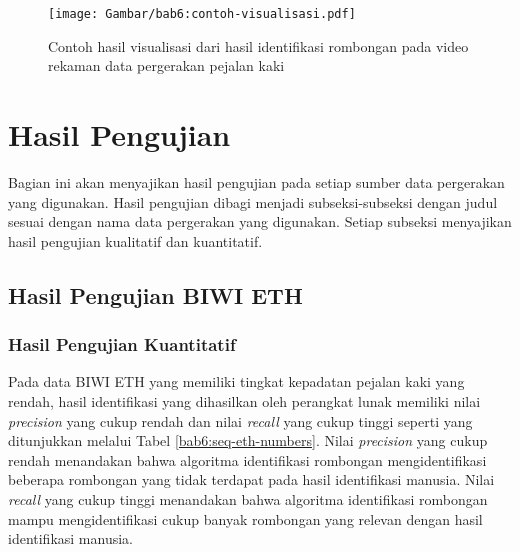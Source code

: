 \begin{figure}[h]
    \centering
    \captionsetup{width=0.85\textwidth}
    \texttt{[image: Gambar/bab6:contoh-visualisasi.pdf]}
    \caption[Contoh hasil visualisasi rombongan]{Contoh hasil visualisasi dari hasil identifikasi rombongan pada video rekaman data pergerakan pejalan kaki}
    \label{bab6:contoh-visualisasi}
\end{figure}

\section{Hasil Pengujian}
\label{sec:result}

Bagian ini akan menyajikan hasil pengujian pada setiap sumber data pergerakan yang digunakan. Hasil pengujian dibagi menjadi subseksi-subseksi dengan judul sesuai dengan nama data pergerakan yang digunakan. Setiap subseksi menyajikan hasil pengujian kualitatif dan kuantitatif.

\subsection{Hasil Pengujian BIWI ETH}
\label{subsec:eth-result}

\subsubsection{Hasil Pengujian Kuantitatif}
\label{subsubsec:eth-quantitative}

Pada data BIWI ETH yang memiliki tingkat kepadatan pejalan kaki yang rendah, hasil identifikasi yang dihasilkan oleh perangkat lunak memiliki nilai \textit{precision} yang cukup rendah dan nilai \textit{recall} yang cukup tinggi seperti yang ditunjukkan melalui Tabel \ref{bab6:seq-eth-numbers}. Nilai \textit{precision} yang cukup rendah menandakan bahwa algoritma identifikasi rombongan mengidentifikasi beberapa rombongan yang tidak terdapat pada hasil identifikasi manusia. Nilai \textit{recall} yang cukup tinggi menandakan bahwa algoritma identifikasi rombongan mampu
mengidentifikasi cukup banyak rombongan yang relevan dengan hasil identifikasi manusia.

